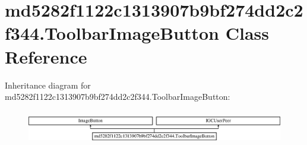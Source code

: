 \hypertarget{classmd5282f1122c1313907b9bf274dd2c2f344_1_1ToolbarImageButton}{}\section{md5282f1122c1313907b9bf274dd2c2f344.\+Toolbar\+Image\+Button Class Reference}
\label{classmd5282f1122c1313907b9bf274dd2c2f344_1_1ToolbarImageButton}
Inheritance diagram for md5282f1122c1313907b9bf274dd2c2f344.\+Toolbar\+Image\+Button\+:\begin{figure}[H]
\begin{center}
\leavevmode
\includegraphics[height=1.501341cm]{classmd5282f1122c1313907b9bf274dd2c2f344_1_1ToolbarImageButton}
\end{center}
\end{figure}
